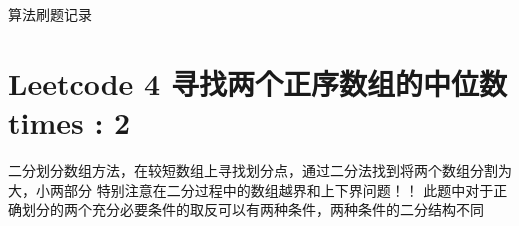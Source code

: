 \documentclass[UTF8]{ctexart}
\begin{document}
算法刷题记录

\section{Leetcode 4 寻找两个正序数组的中位数 times : 2}
二分划分数组方法，在较短数组上寻找划分点，通过二分法找到将两个数组分割为大，小两部分
特别注意在二分过程中的数组越界和上下界问题！！
此题中对于正确划分的两个充分必要条件的取反可以有两种条件，两种条件的二分结构不同
\end{document}
